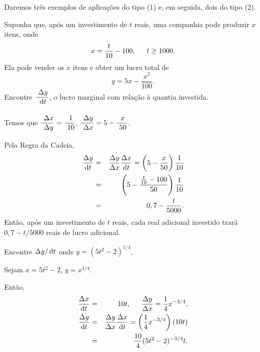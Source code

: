 Daremos três exemplos de aplicações do tipo (1) e, em seguida, dois do tipo
(2).

\begin{example}
Suponha que, após um investimento de $t$ reais, uma companhia pode
produzir $x$ itens, onde
$$
  x = \frac{t}{10} - 100, \hspace{1.5em} t \ge 1000.
$$
Ela pode vender os $x$ itens e obter um lucro total de
$$
  y = 5x - \frac{x^2}{100}.
$$
Encontre $\dsfrac{\dy}{\dt}$, o lucro marginal com relação à quantia investida.

Temos que \hspace{1.5em} $\dsfrac{\dx}{\dy} = \dsfrac{1}{10}$, \hspace{1.5em}
$\dsfrac{\dy}{\dx} = 5 - \dsfrac{x}{50}$.

Pela Regra da Cadeia,
\begin{eqnarray*}
  \frac{\dy}{\dt} & = & \frac{\dy}{\dx} \frac{\dx}{\dt} =
    \left( 5 - \frac{x}{50} \right) \frac{1}{10} \\
  & = & \left( 5 - \frac{\frac{t}{10}-100}{50} \right) \frac{1}{10} \\
  & = & 0,7 - \frac{t}{5000}.
\end{eqnarray*}
Então, após um investimento de $t$ reais, cada real adicional investido
trará $0,7 - t/5000$ reais de lucro adicional.
\end{example}

\begin{example}
Encontre $\dy/\dt$ onde $y = (5t^2 - 2)^{1/4}$.

Sejam \hspace{1.5em} $x = 5t^2 - 2$, \hspace{1.5em} $y = x^{1/4}$.

Então,
\begin{eqnarray*}
  \frac{\dx}{\dt} & = & 10t, \hspace{1.5em} \frac{\dy}{\dx} = \frac{1}{4}x^{-3/4},\\
  \frac{\dy}{\dt} & = & \frac{\dy}{\dx}\frac{\dx}{\dt} =
    \left( \frac{1}{4} x^{-3/4} \right)(10t) \\
  & = & \frac{10}{4}(5t^2-2)^{-3/4}t.
\end{eqnarray*}
\end{example}

